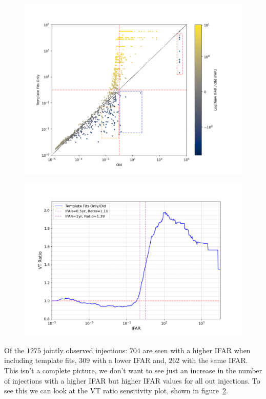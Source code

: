 \begin{figure}
    \centering  
    \includegraphics[width=1.2\textwidth]{images/5_pycbclive/fits_only_0s_ifar_vs_ifar_regions.png}
    \caption{}
    \label{fig:pycbclive-ifar-ifar-fits-only-0s-regions}
\end{figure}
%
\begin{figure}
    \centering
    \includegraphics[width=1\textwidth]{images/5_pycbclive/fits_only_0s_vt_ratio.png}
    \caption{}
    \label{fig:pycbclive-sensitivity-fits-only-0s}
\end{figure}
%
Of the $1275$ jointly observed injections: $704$ are seen with a higher IFAR when including template fits, $309$ with a lower IFAR and, $262$ with the same IFAR. This isn't a complete picture, we don't want to see just an increase in the number of injections with a higher IFAR but higher IFAR values for all out injections. To see this we can look at the VT ratio sensitivity plot, shown in figure~\ref{fig:pycbclive-sensitivity-fits-only-0s}.


